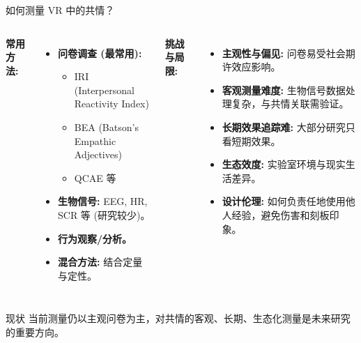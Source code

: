 \documentclass[aspectratio=169,xcolor=dvipsnames]{beamer}
\begin{document}
\begin{frame}{如何测量 VR 中的共情？}
    \begin{columns}[c]
            \textbf{常用方法:}
            \begin{itemize}
                \item \textbf{问卷调查 (最常用):}
                    \begin{itemize}
                        \item IRI (Interpersonal Reactivity Index)
                        \item BEA (Batson's Empathic Adjectives)
                        \item QCAE 等
                    \end{itemize}
                \item \textbf{生物信号:} EEG, HR, SCR 等 (研究较少)。
                \item \textbf{行为观察/分析。}
                \item \textbf{混合方法:} 结合定量与定性。
            \end{itemize}

             \textbf{挑战与局限:}
             \begin{itemize}
                \item \textbf{主观性与偏见:} 问卷易受社会期许效应影响。
                \item \textbf{客观测量难度:} 生物信号数据处理复杂，与共情关联需验证。
                \item \textbf{长期效果追踪难:} 大部分研究只看短期效果。
                \item \textbf{生态效度:} 实验室环境与现实生活差异。
                \item \textbf{设计伦理:} 如何负责任地使用他人经验，避免伤害和刻板印象。
            \end{itemize}
    \end{columns}
    \begin{alertblock}{现状}
    当前测量仍以主观问卷为主，对共情的客观、长期、生态化测量是未来研究的重要方向。
    \end{alertblock}
\end{frame}
\end{document}
